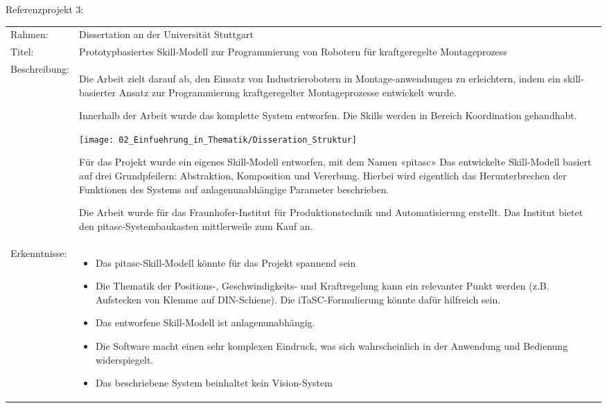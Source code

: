	\newpage
	
	Referenzprojekt 3:
	\vspace{2mm}
	\\
	\begin{tabularx}{\textwidth}{@{}>{}p{8em} X@{}}
		Rahmen: & 
		Dissertation an der Universität Stuttgart 
		\\
		
		Titel: & 
		Prototypbasiertes Skill-Modell zur Programmierung von Robotern für kraftgeregelte Montageprozess
		\\
		
		Beschreibung: & 
		Die Arbeit zielt darauf ab, den Einsatz von Industrierobotern in Montage-anwendungen zu erleichtern, indem ein skill-basierter Ansatz zur Programmierung kraftgeregelter Montageprozesse entwickelt wurde. 
		
		Innerhalb der Arbeit wurde das komplette System entworfen. Die Skills werden in Bereich Koordination gehandhabt.  
		
		\texttt{[image: 02\_Einfuehrung\_in\_Thematik/Disseration\_Struktur]}
		
		Für das Projekt wurde ein eigenes Skill-Modell entworfen, mit dem Namen «pitasc»
		Das entwickelte Skill-Modell basiert auf drei Grundpfeilern: Abstraktion, Komposition und Vererbung. Hierbei wird eigentlich das Herunterbrechen der Funktionen des Systems auf anlagenunabhängige Parameter beschrieben. 
		
		Die Arbeit wurde für das Fraunhofer-Institut für Produktionstechnik und Automatisierung erstellt. Das Institut bietet den pitasc-Systembaukasten mittlerweile zum Kauf an. 
		\\
		
		Erkenntnisse: & 
		\begin{itemize}
			\item Das pitasc-Skill-Modell könnte für das Projekt spannend sein
			\item Die Thematik der Positions-, Geschwindigkeits- und Kraftregelung kann ein relevanter Punkt werden (z.B. Aufstecken von Klemme auf DIN-Schiene). Die iTaSC-Formulierung könnte dafür hilfreich sein. 
			\item Das entworfene Skill-Modell ist anlagenunabhängig. 
			\item Die Software macht einen sehr komplexen Eindruck, was sich wahrscheinlich in der Anwendung und Bedienung widerspiegelt.
			\item Das beschriebene System beinhaltet kein Vision-System
		\end{itemize}
	\end{tabularx}
	

